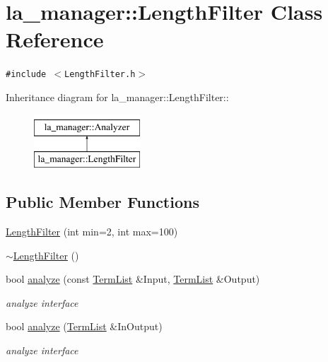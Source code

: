 \hypertarget{classla__manager_1_1LengthFilter}{
\section{la\_\-manager::LengthFilter Class Reference}
\label{classla__manager_1_1LengthFilter}
}
{\tt \#include $<$LengthFilter.h$>$}

Inheritance diagram for la\_\-manager::LengthFilter::\begin{figure}[H]
\begin{center}
\leavevmode
\includegraphics[height=2cm]{classla__manager_1_1LengthFilter}
\end{center}
\end{figure}
\subsection*{Public Member Functions}
\begin{CompactItemize}
\item 
\hyperlink{classla__manager_1_1LengthFilter_eec14982208a4aba759f923bb65fc6e9}{LengthFilter} (int min=2, int max=100)
\item 
\hyperlink{classla__manager_1_1LengthFilter_3afc736224fe2ae9025ae1153eac6b51}{$\sim$LengthFilter} ()
\item 
bool \hyperlink{classla__manager_1_1LengthFilter_9a4d7237f42892d2ed54ab22d3411741}{analyze} (const \hyperlink{namespacela__manager_06c0aab93982ee3ebc3ef9d0419e619a}{TermList} \&Input, \hyperlink{namespacela__manager_06c0aab93982ee3ebc3ef9d0419e619a}{TermList} \&Output)
\begin{CompactList}\small\item\em analyze interface \item\end{CompactList}\item 
bool \hyperlink{classla__manager_1_1LengthFilter_0b26aaa94ed79a49609fb92e25109831}{analyze} (\hyperlink{namespacela__manager_06c0aab93982ee3ebc3ef9d0419e619a}{TermList} \&InOutput)
\begin{CompactList}\small\item\em analyze interface \item\end{CompactList}\end{CompactItemize}
